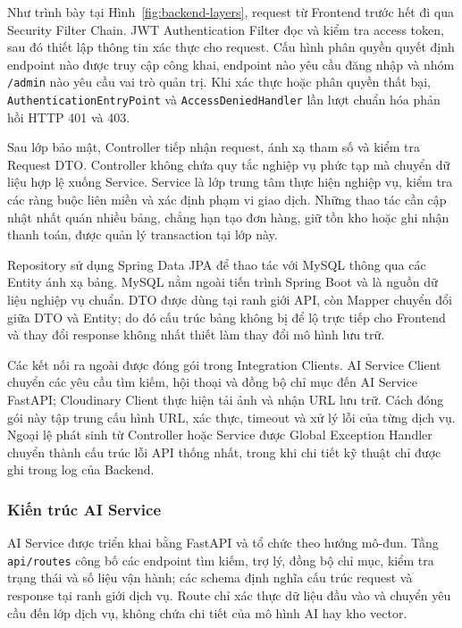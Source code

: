 Như trình bày tại Hình~\ref{fig:backend-layers}, request từ Frontend trước hết đi qua Security Filter Chain. JWT Authentication Filter đọc và kiểm tra access token, sau đó thiết lập thông tin xác thực cho request. Cấu hình phân quyền quyết định endpoint nào được truy cập công khai, endpoint nào yêu cầu đăng nhập và nhóm \texttt{/admin} nào yêu cầu vai trò quản trị. Khi xác thực hoặc phân quyền thất bại, \texttt{AuthenticationEntryPoint} và \texttt{AccessDeniedHandler} lần lượt chuẩn hóa phản hồi HTTP 401 và 403.

Sau lớp bảo mật, Controller tiếp nhận request, ánh xạ tham số và kiểm tra Request DTO. Controller không chứa quy tắc nghiệp vụ phức tạp mà chuyển dữ liệu hợp lệ xuống Service. Service là lớp trung tâm thực hiện nghiệp vụ, kiểm tra các ràng buộc liên miền và xác định phạm vi giao dịch. Những thao tác cần cập nhật nhất quán nhiều bảng, chẳng hạn tạo đơn hàng, giữ tồn kho hoặc ghi nhận thanh toán, được quản lý transaction tại lớp này.

Repository sử dụng Spring Data JPA để thao tác với MySQL thông qua các Entity ánh xạ bảng. MySQL nằm ngoài tiến trình Spring Boot và là nguồn dữ liệu nghiệp vụ chuẩn. DTO được dùng tại ranh giới API, còn Mapper chuyển đổi giữa DTO và Entity; do đó cấu trúc bảng không bị để lộ trực tiếp cho Frontend và thay đổi response không nhất thiết làm thay đổi mô hình lưu trữ.

Các kết nối ra ngoài được đóng gói trong Integration Clients. AI Service Client chuyển các yêu cầu tìm kiếm, hội thoại và đồng bộ chỉ mục đến AI Service FastAPI; Cloudinary Client thực hiện tải ảnh và nhận URL lưu trữ. Cách đóng gói này tập trung cấu hình URL, xác thực, timeout và xử lý lỗi của từng dịch vụ. Ngoại lệ phát sinh từ Controller hoặc Service được Global Exception Handler chuyển thành cấu trúc lỗi API thống nhất, trong khi chi tiết kỹ thuật chỉ được ghi trong log của Backend.

\subsubsection{Kiến trúc AI Service}

AI Service được triển khai bằng FastAPI và tổ chức theo hướng mô-đun. Tầng \texttt{api/routes} công bố các endpoint tìm kiếm, trợ lý, đồng bộ chỉ mục, kiểm tra trạng thái và số liệu vận hành; các schema định nghĩa cấu trúc request và response tại ranh giới dịch vụ. Route chỉ xác thực dữ liệu đầu vào và chuyển yêu cầu đến lớp dịch vụ, không chứa chi tiết của mô hình AI hay kho vector.

